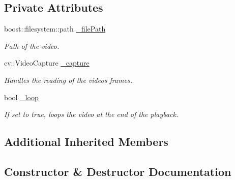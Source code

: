 \subsection*{Private Attributes}
\begin{DoxyCompactItemize}
\item 
\mbox{\label{classfilter_1_1data_1_1_file_video_input_a3688b3fe35d4e53bb77340c937c837e1}} 
boost\+::filesystem\+::path \hyperlink{classfilter_1_1data_1_1_file_video_input_a3688b3fe35d4e53bb77340c937c837e1}{\+\_\+file\+Path}
\begin{DoxyCompactList}\small\item\em Path of the video. \end{DoxyCompactList}\item 
\mbox{\label{classfilter_1_1data_1_1_file_video_input_af9be93f58c33b095c635ca43fbeedc64}} 
cv\+::\+Video\+Capture \hyperlink{classfilter_1_1data_1_1_file_video_input_af9be93f58c33b095c635ca43fbeedc64}{\+\_\+capture}
\begin{DoxyCompactList}\small\item\em Handles the reading of the video\textquotesingle{}s frames. \end{DoxyCompactList}\item 
\mbox{\label{classfilter_1_1data_1_1_file_video_input_a845591eabd4f19be613d0f5284baf38f}} 
bool \hyperlink{classfilter_1_1data_1_1_file_video_input_a845591eabd4f19be613d0f5284baf38f}{\+\_\+loop}
\begin{DoxyCompactList}\small\item\em If set to true, loops the video at the end of the playback. \end{DoxyCompactList}\end{DoxyCompactItemize}
\subsection*{Additional Inherited Members}


\subsection{Constructor \& Destructor Documentation}
\mbox{\label{classfilter_1_1data_1_1_file_video_input_aa585659183e8225ad97fafffe5e58dca}} 
